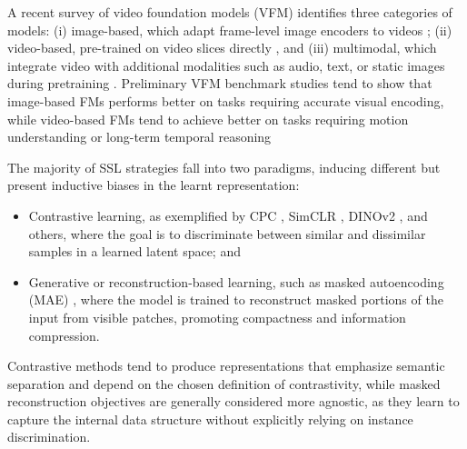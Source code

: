 A recent survey of video foundation models (VFM) identifies three categories of models: (i) image-based, which adapt frame-level image encoders to videos \cite{resnet}; (ii) video-based, pre-trained on video slices directly \cite{videomae}, and (iii) multimodal, which integrate video with additional modalities such as audio, text, or static images during pretraining \cite{lin2022egocentricvideolanguagepretraining, Desai2023, li2024videovistaversatilebenchmarkvideo, madan2024foundationmodelsvideounderstanding}. Preliminary VFM benchmark studies tend to show that image-based FMs performs better on tasks requiring accurate visual encoding, while video-based FMs tend to achieve better on tasks requiring motion understanding or long-term temporal reasoning \cite{madan2024foundationmodelsvideounderstanding}


The majority of SSL strategies fall into two paradigms, inducing different but present inductive biases in the learnt representation:

\begin{itemize}
    \item Contrastive learning, as exemplified by CPC \cite{Oord_Oriol_2018}, SimCLR \cite{pmlr-v119-chen20j}, DINOv2 \cite{oquab2023dinov2}, and others, where the goal is to discriminate between similar and dissimilar samples in a learned latent space; and
	\item Generative or reconstruction-based learning, such as masked autoencoding (MAE) \cite{MAE, videomae}, where the model is trained to reconstruct masked portions of the input from visible patches, promoting compactness and information compression.
\end{itemize}

Contrastive methods tend to produce representations that emphasize semantic separation and depend on the chosen definition of contrastivity, while masked reconstruction objectives are generally considered more agnostic, as they learn to capture the internal data structure without explicitly relying on instance discrimination.

